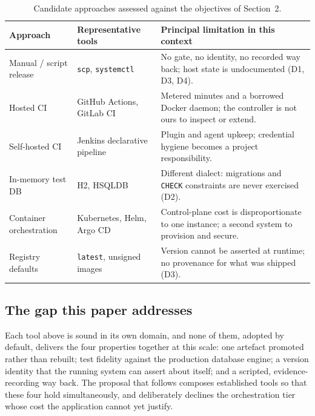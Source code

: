 \documentclass[10pt,a4paper]{article}
\begin{document}
\begin{table}[h]
\centering
\caption{Candidate approaches assessed against the objectives of Section~2.}
\vspace{-2pt}
{\footnotesize
\begin{tabularx}{\textwidth}{L{3.05cm} L{3.35cm} X}
\toprule
{}\textbf{Approach} & \textbf{Representative tools} &
\textbf{Principal limitation in this context} \\
\midrule
Manual / script release & \texttt{scp}, \texttt{systemctl} & No gate, no identity, no recorded
way back; host state is undocumented (D1, D3, D4). \\
Hosted CI & GitHub Actions, GitLab CI & Metered minutes and a borrowed Docker daemon; the
controller is not ours to inspect or extend. \\
Self-hosted CI & Jenkins declarative pipeline & Plugin and agent upkeep; credential hygiene
becomes a project responsibility. \\
In-memory test DB & H2, HSQLDB & Different dialect: migrations and \texttt{CHECK} constraints
are never exercised (D2). \\
Container orchestration & Kubernetes, Helm, Argo CD & Control-plane cost is disproportionate to
one instance; a second system to provision and secure. \\
Registry defaults & \texttt{latest}, unsigned images & Version cannot be asserted at runtime; no
provenance for what was shipped (D3). \\
\bottomrule
\end{tabularx}}
\end{table}

\subsection{The gap this paper addresses}
Each tool above is sound in its own domain, and none of them, adopted by default, delivers the
four properties together at this scale: one artefact promoted rather than rebuilt; test fidelity
against the production database engine; a version identity that the running system can assert
about itself; and a scripted, evidence-recording way back. The proposal that follows composes
established tools so that these four hold simultaneously, and deliberately declines the
orchestration tier whose cost the application cannot yet justify.

\newpage

\end{document}
